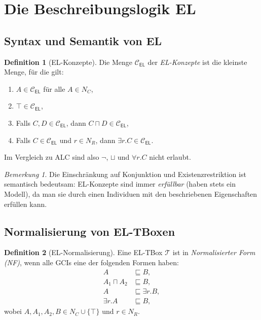﻿\documentclass[a4paper,12pt]{article}
\theoremstyle{definition}
\newtheorem{definition}{Definition}[section]
\theoremstyle{plain}
\theoremstyle{remark}
\newtheorem{bemerkung}{Bemerkung}[section]
\newcommand{\Tbox}{\ensuremath{\mathcal{T}}}
\begin{document}
\section{Die Beschreibungslogik EL}
\label{sec:el}

\subsection{Syntax und Semantik von EL}

\begin{definition}[EL-Konzepte]
\label{def:el-syntax}
Die Menge $\mathcal{C}_{\textsf{EL}}$ der
\emph{\textsf{EL}-Konzepte} ist die kleinste Menge, f{\"{u}}r die gilt:
\begin{enumerate}[label=(\roman*)]
  \item $A \in \mathcal{C}_{\textsf{EL}}$ f{\"{u}}r alle $A \in N_C$,
  \item $\top \in \mathcal{C}_{\textsf{EL}}$,
  \item Falls $C, D \in \mathcal{C}_{\textsf{EL}}$, dann
        $C \sqcap D \in \mathcal{C}_{\textsf{EL}}$,
  \item Falls $C \in \mathcal{C}_{\textsf{EL}}$ und $r \in N_R$, dann
        $\exists r.C \in \mathcal{C}_{\textsf{EL}}$.
\end{enumerate}
Im Vergleich zu \textsf{ALC} sind also $\neg$, $\sqcup$ und $\forall r.C$
nicht erlaubt.
\end{definition}

\begin{bemerkung}
Die Einschr{\"{a}}nkung auf Konjunktion und Existenzrestriktion ist semantisch
bedeutsam: \textsf{EL}-Konzepte sind immer \emph{erf{\"{u}}llbar}
(haben stets ein Modell), da man sie durch einen Individuen mit den
beschriebenen Eigenschaften erf{\"{u}}llen kann.
\end{bemerkung}

\subsection{Normalisierung von EL-TBoxen}

\begin{definition}[EL-Normalisierung]
\label{def:el-normal}
Eine \textsf{EL}-TBox $\Tbox$ ist in \emph{Normalisierter Form (NF)},
wenn alle GCIs eine der folgenden Formen haben:
\begin{align}
  A &\sqsubseteq B, \tag{NF1} \label{nf1} \\
  A_1 \sqcap A_2 &\sqsubseteq B, \tag{NF2} \label{nf2} \\
  A &\sqsubseteq \exists r.B, \tag{NF3} \label{nf3} \\
  \exists r.A &\sqsubseteq B, \tag{NF4} \label{nf4}
\end{align}
wobei $A, A_1, A_2, B \in N_C \cup \{\top\}$ und $r \in N_R$.
\end{definition}
\end{document}
